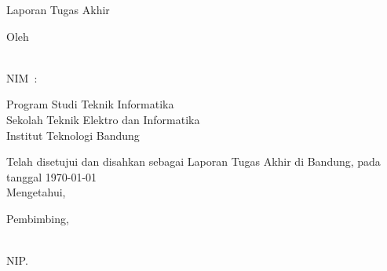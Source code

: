 
\begin{center}
  \smallskip
  \thispagestyle{empty}
  \Large \bfseries \MakeUppercase{\thesistitle}
  \vfill

  \normalsize Laporan Tugas Akhir
  \vfill

  \large Oleh
  
  \large \MakeUppercase{\theauthor} \\
  \large NIM~:~\MakeUppercase{\nim}

  \vfill

  \normalfont{}
  \normalsize Program Studi Teknik Informatika \\
  \normalsize Sekolah Teknik Elektro dan Informatika \\
  \normalsize Institut Teknologi Bandung \\
  \vfill

  \normalsize Telah disetujui dan disahkan sebagai Laporan Tugas Akhir di Bandung, pada tanggal \today \\
  \normalsize Mengetahui, \\
  \vfill

  Pembimbing,
  \vfill

  \underline{\supervisor{}} \\
  NIP.\@ \uppercase{\supervisornip{}} \\
  
\end{center}